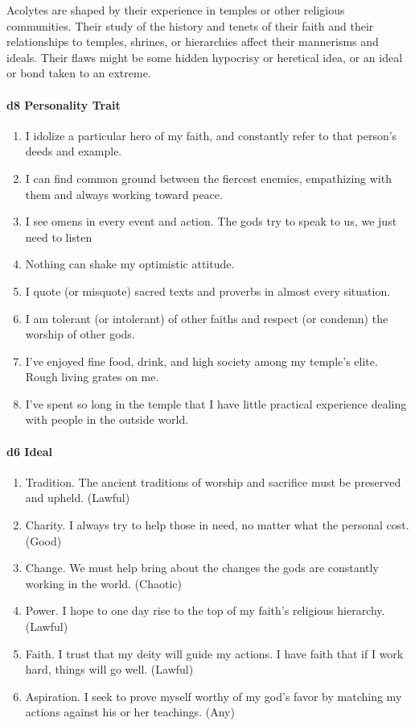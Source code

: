 \documentclass[
]{article}
\providecommand{\tightlist}{%
  \setlength{\itemsep}{0pt}\setlength{\parskip}{0pt}}
\begin{document}
Acolytes are shaped by their experience in temples or other religious
communities. Their study of the history and tenets of their faith and
their relationships to temples, shrines, or hierarchies affect their
mannerisms and ideals. Their flaws might be some hidden hypocrisy or
heretical idea, or an ideal or bond taken to an extreme.

\hypertarget{d8-personality-trait}{%
\paragraph{d8 Personality Trait}\label{d8-personality-trait}}

\begin{enumerate}
\def\labelenumi{\arabic{enumi}.}
\tightlist
\item
  I idolize a particular hero of my faith, and constantly refer to that
  person's deeds and example.
\item
  I can find common ground between the fiercest enemies, empathizing
  with them and always working toward peace.
\item
  I see omens in every event and action. The gods try to speak to us, we
  just need to listen
\item
  Nothing can shake my optimistic attitude.
\item
  I quote (or misquote) sacred texts and proverbs in almost every
  situation.
\item
  I am tolerant (or intolerant) of other faiths and respect (or condemn)
  the worship of other gods.
\item
  I've enjoyed fine food, drink, and high society among my temple's
  elite. Rough living grates on me.
\item
  I've spent so long in the temple that I have little practical
  experience dealing with people in the outside world.
\end{enumerate}

\hypertarget{d6-ideal}{%
\paragraph{d6 Ideal}\label{d6-ideal}}

\begin{enumerate}
\def\labelenumi{\arabic{enumi}.}
\tightlist
\item
  Tradition. The ancient traditions of worship and sacrifice must be
  preserved and upheld. (Lawful)
\item
  Charity. I always try to help those in need, no matter what the
  personal cost. (Good)
\item
  Change. We must help bring about the changes the gods are constantly
  working in the world. (Chaotic)
\item
  Power. I hope to one day rise to the top of my faith's religious
  hierarchy. (Lawful)
\item
  Faith. I trust that my deity will guide my actions. I have faith that
  if I work hard, things will go well. (Lawful)
\item
  Aspiration. I seek to prove myself worthy of my god's favor by
  matching my actions against his or her teachings. (Any)
\end{enumerate}
\end{document}
